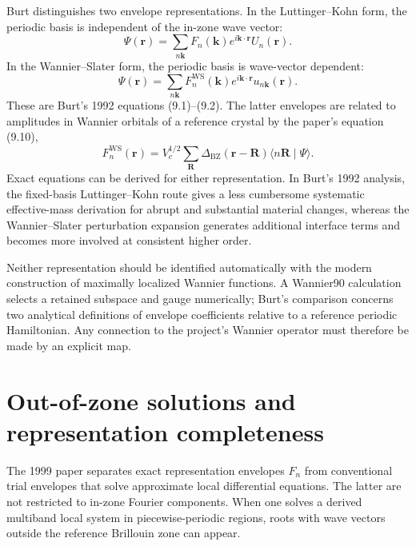 Burt distinguishes two envelope representations. In the Luttinger--Kohn form,
the periodic basis is independent of the in-zone wave vector:
\begin{equation}
  \Psi(\mathbf r)
  =
  \sum_{n\mathbf k}
  F_n(\mathbf k)e^{i\mathbf k\cdot\mathbf r}U_n(\mathbf r).
\end{equation}
In the Wannier--Slater form, the periodic basis is wave-vector dependent:
\begin{equation}
  \Psi(\mathbf r)
  =
  \sum_{n\mathbf k}
  F_n^{\mathrm{WS}}(\mathbf k)
  e^{i\mathbf k\cdot\mathbf r}u_{n\mathbf k}(\mathbf r).
\end{equation}
These are Burt's 1992 equations (9.1)--(9.2). The latter envelopes are related
to amplitudes in Wannier orbitals of a reference crystal by the paper's equation
(9.10),
\begin{equation}
  F_n^{\mathrm{WS}}(\mathbf r)
  =
  V_c^{1/2}\sum_{\mathbf R}
  \Delta_{\mathrm{BZ}}(\mathbf r-\mathbf R)
  \langle n\mathbf R\mid\Psi\rangle.
  \label{eq:burt-wannier-slater-amplitudes}
\end{equation}
Exact equations can be derived for either representation. In Burt's 1992
analysis, the fixed-basis Luttinger--Kohn route gives a less cumbersome
systematic effective-mass derivation for abrupt and substantial material changes,
whereas the Wannier--Slater perturbation expansion generates additional interface
terms and becomes more involved at consistent higher order.

Neither representation should be identified automatically with the modern
construction of maximally localized Wannier functions. A Wannier90 calculation
selects a retained subspace and gauge numerically; Burt's comparison concerns two
analytical definitions of envelope coefficients relative to a reference periodic
Hamiltonian. Any connection to the project's Wannier operator must therefore be
made by an explicit map.

\section{Out-of-zone solutions and representation completeness}

The 1999 paper separates exact representation envelopes $F_n$ from conventional
trial envelopes that solve approximate local differential equations. The latter
are not restricted to in-zone Fourier components. When one solves a derived
multiband local system in piecewise-periodic regions, roots with wave vectors
outside the reference Brillouin zone can appear.


